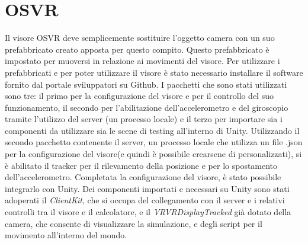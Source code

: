 \section{OSVR}
Il visore OSVR deve semplicemente sostituire l'oggetto camera con un suo prefabbricato creato apposta per questo compito. Questo prefabbricato è impostato per muoversi in relazione ai movimenti del visore. Per utilizzare i prefabbricati e per poter utilizzare il visore è stato necessario installare il software fornito dal portale sviluppatori su Github. I pacchetti che sono stati utilizzati sono tre: il primo per la configurazione del visore e per il controllo del suo funzionamento, il secondo per l'abilitazione dell'accelerometro e del giroscopio tramite l'utilizzo del server (un processo locale) e il terzo per importare sia i componenti da utilizzare sia le scene di testing all'interno di Unity. Utilizzando il secondo pacchetto contenente il server, un processo locale che utilizza un file .json per la configurazione del visore(e quindi è possibile crearsene di personalizzati), si è abilitato il tracker per il rilevamento della posizione e per lo spostamento dell'accelerometro. Completata la configurazione del visore, è stato possibile integrarlo con Unity. Dei componenti importati e necessari su Unity sono stati adoperati il \textit{ClientKit}, che si occupa del collegamento con il server e i relativi controlli tra il visore e il calcolatore, e il \textit{VRVRDisplayTracked} già dotato della camera, che consente di visualizzare la simulazione, e degli script per il movimento all'interno del mondo.


























%

